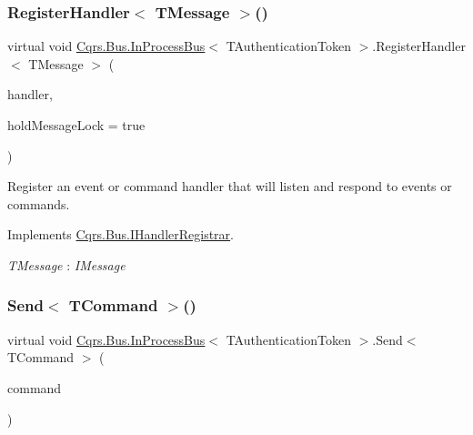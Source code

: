 \subsubsection{\texorpdfstring{Register\+Handler$<$ T\+Message $>$()}{RegisterHandler< TMessage >()}\hspace{0.1cm}{\footnotesize\ttfamily [2/2]}}
{\footnotesize\ttfamily virtual void \hyperlink{classCqrs_1_1Bus_1_1InProcessBus}{Cqrs.\+Bus.\+In\+Process\+Bus}$<$ T\+Authentication\+Token $>$.Register\+Handler$<$ T\+Message $>$ (\begin{DoxyParamCaption}\item[{Action$<$ T\+Message $>$}]{handler,  }\item[{bool}]{hold\+Message\+Lock = {\ttfamily true} }\end{DoxyParamCaption})\hspace{0.3cm}{\ttfamily [virtual]}}



Register an event or command handler that will listen and respond to events or commands. 



Implements \hyperlink{interfaceCqrs_1_1Bus_1_1IHandlerRegistrar_a07792dcc9a8b272709ff2e2dd336a642_a07792dcc9a8b272709ff2e2dd336a642}{Cqrs.\+Bus.\+I\+Handler\+Registrar}.

\begin{Desc}
\item[Type Constraints]\begin{description}
\item[{\em T\+Message} : {\em I\+Message}]\end{description}
\end{Desc}
\mbox{\label{classCqrs_1_1Bus_1_1InProcessBus_a6a074ef3663d2855875307b106fe4416_a6a074ef3663d2855875307b106fe4416}} 
\subsubsection{\texorpdfstring{Send$<$ T\+Command $>$()}{Send< TCommand >()}\hspace{0.1cm}{\footnotesize\ttfamily [1/2]}}
{\footnotesize\ttfamily virtual void \hyperlink{classCqrs_1_1Bus_1_1InProcessBus}{Cqrs.\+Bus.\+In\+Process\+Bus}$<$ T\+Authentication\+Token $>$.Send$<$ T\+Command $>$ (\begin{DoxyParamCaption}\item[{T\+Command}]{command }\end{DoxyParamCaption})\hspace{0.3cm}{\ttfamily [virtual]}}



